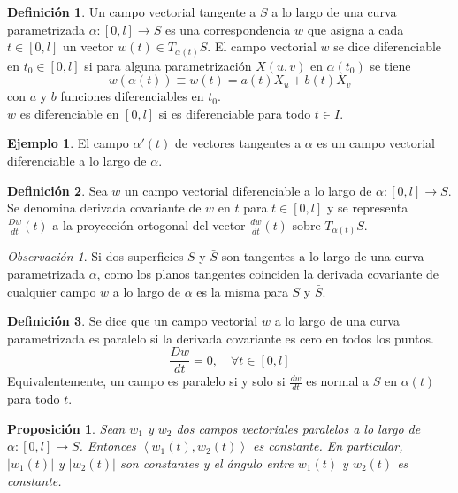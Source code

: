 \documentclass{report}
\newtheorem{proposition}[theorem]{Proposición}
\theoremstyle{remark}
\newtheorem*{remark}{Observación}
\theoremstyle{remark}
\theoremstyle{definition}
\newtheorem{definition}{Definición}[chapter]
\theoremstyle{definition}
\theoremstyle{definition}
\newtheorem*{example}{Ejemplo}
\begin{document}
\begin{definition}
    Un campo vectorial tangente a $S$ a lo largo de una curva parametrizada $\alpha : [0, l] \to S$ es una correspondencia $w$ que asigna a cada $t \in [0, l]$ un vector $w(t) \in T_{\alpha(t)}S$.
    El campo vectorial $w$ se dice diferenciable en $t_0 \in [0, l]$ si para alguna parametrización $X(u, v)$ en $\alpha(t_0)$ se tiene
    $$w(\alpha(t)) \equiv w(t) = a(t)X_u + b(t)X_v$$
    con $a$ y $b$ funciones diferenciables en $t_0$.\\
    $w$ es diferenciable en $[0, l]$ si es diferenciable para todo $t \in I$.
\end{definition}

\begin{example}
    El campo $\alpha'(t)$ de vectores tangentes a $\alpha$ es un campo vectorial diferenciable a lo largo de $\alpha$.
\end{example}

\begin{definition}
    Sea $w$ un campo vectorial diferenciable a lo largo de $\alpha : [0, l] \to S$.
    Se denomina derivada covariante de $w$ en $t$ para $t \in [0, l]$ y se representa $\frac{Dw}{dt}(t)$ a la proyección ortogonal del vector $\frac{dw}{dt}(t)$ sobre $T_{\alpha(t)}S$.
\end{definition}

\begin{remark}
    Si dos superficies $S$ y $\bar{S}$ son tangentes a lo largo de una curva parametrizada $\alpha$, como los planos tangentes coinciden la derivada covariante de cualquier campo $w$ a lo largo de $\alpha$ es la misma para $S$ y $\bar{S}$.
\end{remark}

\begin{definition}
    Se dice que un campo vectorial $w$ a lo largo de una curva parametrizada es paralelo si la derivada covariante es cero en todos los puntos.
    $$\frac{Dw}{dt} = 0, \quad \forall t \in [0, l]$$
    Equivalentemente, un campo es paralelo si y solo si $\frac{dw}{dt}$ es normal a $S$ en $\alpha(t)$ para todo $t$.
\end{definition}

\begin{proposition}
    Sean $w_1$ y $w_2$ dos campos vectoriales paralelos a lo largo de $\alpha : [0, l] \to S$.
    Entonces $\left\langle w_1(t), w_2(t) \right\rangle$ es constante.
    En particular, $|w_1(t)|$ y $|w_2(t)|$ son constantes y el ángulo entre $w_1(t)$ y $w_2(t)$ es constante.
\end{proposition}
\end{document}
